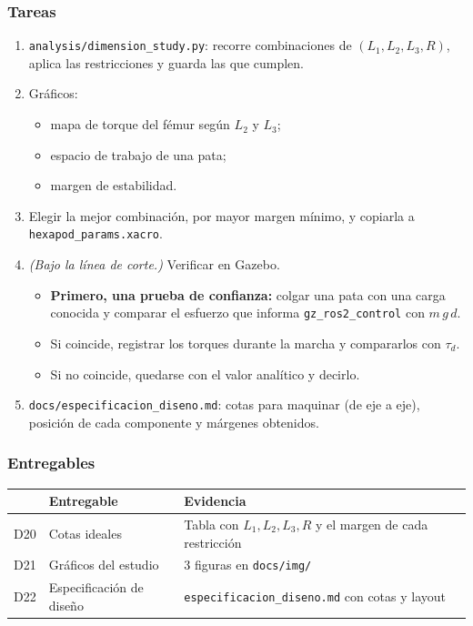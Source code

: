 \documentclass[11pt,a4paper]{article}
\begin{document}
\subsubsection{Tareas}
\begin{enumerate}[label=T\arabic*]
  \item \texttt{analysis/dimension\_study.py}: recorre combinaciones de $(L_1, L_2, L_3, R)$, aplica las restricciones y guarda las que cumplen.
  \item Gráficos:
  \begin{itemize}
    \item mapa de torque del fémur según $L_2$ y $L_3$;
    \item espacio de trabajo de una pata;
    \item margen de estabilidad.
  \end{itemize}
  \item Elegir la mejor combinación, por mayor margen mínimo, y copiarla a \texttt{hexapod\_params.xacro}.
  \item \emph{(Bajo la línea de corte.)} Verificar en Gazebo.
  \begin{itemize}
    \item \textbf{Primero, una prueba de confianza:} colgar una pata con una carga conocida y comparar el esfuerzo que informa \texttt{gz\_ros2\_control} con $m\,g\,d$.
    \item Si coincide, registrar los torques durante la marcha y compararlos con $\tau_d$.
    \item Si no coincide, quedarse con el valor analítico y decirlo.
  \end{itemize}
  \item \texttt{docs/especificacion\_diseno.md}: cotas para maquinar (de eje a eje), posición de cada componente y márgenes obtenidos.
\end{enumerate}

\subsubsection{Entregables}
\begin{tabularx}{\linewidth}{@{}l Y Y@{}}
\toprule \textbf{} & \textbf{Entregable} & \textbf{Evidencia}\\ \midrule
D20 & Cotas ideales & Tabla con $L_1, L_2, L_3, R$ y el margen de cada restricción\\
D21 & Gráficos del estudio & 3 figuras en \texttt{docs/img/}\\
D22 & Especificación de diseño & \texttt{especificacion\_diseno.md} con cotas y layout\\
\bottomrule
\end{tabularx}
\end{document}
